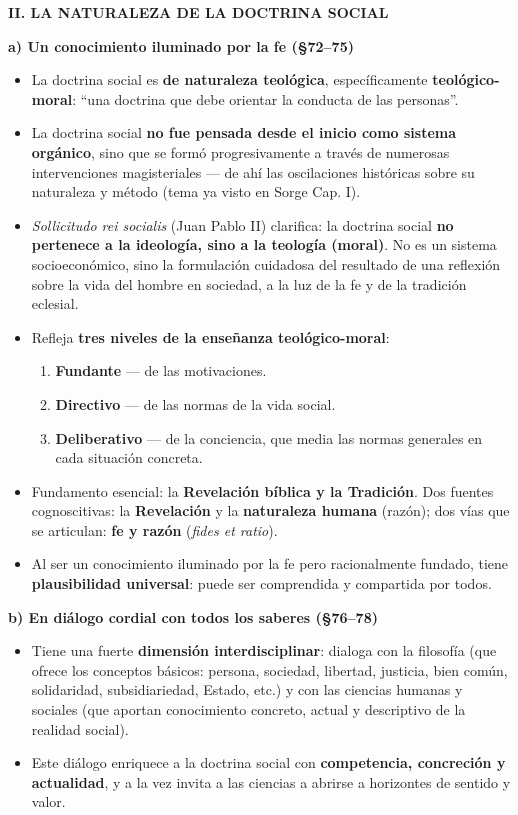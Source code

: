 \documentclass[10pt,a4paper]{article}
\begin{document}
\medskip\noindent \textbf{II. LA NATURALEZA DE LA DOCTRINA SOCIAL}\par\nopagebreak

\medskip\noindent \textbf{a) Un conocimiento iluminado por la fe (\S{}72--75)}\par\nopagebreak
\begin{itemize}
\item La doctrina social es \textbf{de naturaleza teológica}, específicamente \textbf{teológico-moral}: ``una doctrina que debe orientar la conducta de las personas''.
\item La doctrina social \textbf{no fue pensada desde el inicio como sistema orgánico}, sino que se formó progresivamente a través de numerosas intervenciones magisteriales --- de ahí las oscilaciones históricas sobre su naturaleza y método (tema ya visto en Sorge Cap. I).
\item \textit{Sollicitudo rei socialis} (Juan Pablo II) clarifica: la doctrina social \textbf{no pertenece a la ideología, sino a la teología (moral)}. No es un sistema socioeconómico, sino la formulación cuidadosa del resultado de una reflexión sobre la vida del hombre en sociedad, a la luz de la fe y de la tradición eclesial.
\item Refleja \textbf{tres niveles de la enseñanza teológico-moral}:
\begin{enumerate}
\item \textbf{Fundante} --- de las motivaciones.
\item \textbf{Directivo} --- de las normas de la vida social.
\item \textbf{Deliberativo} --- de la conciencia, que media las normas generales en cada situación concreta.
\end{enumerate}
\item Fundamento esencial: la \textbf{Revelación bíblica y la Tradición}. Dos fuentes cognoscitivas: la \textbf{Revelación} y la \textbf{naturaleza humana} (razón); dos vías que se articulan: \textbf{fe y razón} (\textit{fides et ratio}).
\item Al ser un conocimiento iluminado por la fe pero racionalmente fundado, tiene \textbf{plausibilidad universal}: puede ser comprendida y compartida por todos.
\end{itemize}

\medskip\noindent \textbf{b) En diálogo cordial con todos los saberes (\S{}76--78)}\par\nopagebreak
\begin{itemize}
\item Tiene una fuerte \textbf{dimensión interdisciplinar}: dialoga con la filosofía (que ofrece los conceptos básicos: persona, sociedad, libertad, justicia, bien común, solidaridad, subsidiariedad, Estado, etc.) y con las ciencias humanas y sociales (que aportan conocimiento concreto, actual y descriptivo de la realidad social).
\item Este diálogo enriquece a la doctrina social con \textbf{competencia, concreción y actualidad}, y a la vez invita a las ciencias a abrirse a horizontes de sentido y valor.
\end{itemize}
\end{document}
